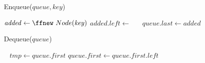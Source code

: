 \documentclass[14pt,a4paper]{extarticle}
\begin{document}
\pagestyle{empty}
\noindent
\setlength\parindent{0pt}

\begin{procedure}[H]
	\caption{Enqueue($\mathit{queue, key}$)}
	\BlankLine
	$\mathit{added} \leftarrow \ffnew~ Node(\mathit{key})$ \;
	$\mathit{added.left} \leftarrow$ \;
	 { }{ }
	$\mathit{queue.last} \leftarrow \mathit{added}$ \;
\end{procedure}

\vspace{1cm}

\begin{procedure}[H]
	\caption{Dequeue($\mathit{queue}$)}
	\BlankLine
	  \;
	$\mathit{tmp} \leftarrow \mathit{queue.first}$ 
	\eIf{$\hspace{5cm}$}{
		  \;
		  \;
	} {
		$\mathit{queue.first} \leftarrow \mathit{queue.first.left}$ \;
	}
	  \;
	 \;
\end{procedure}
\end{document}

